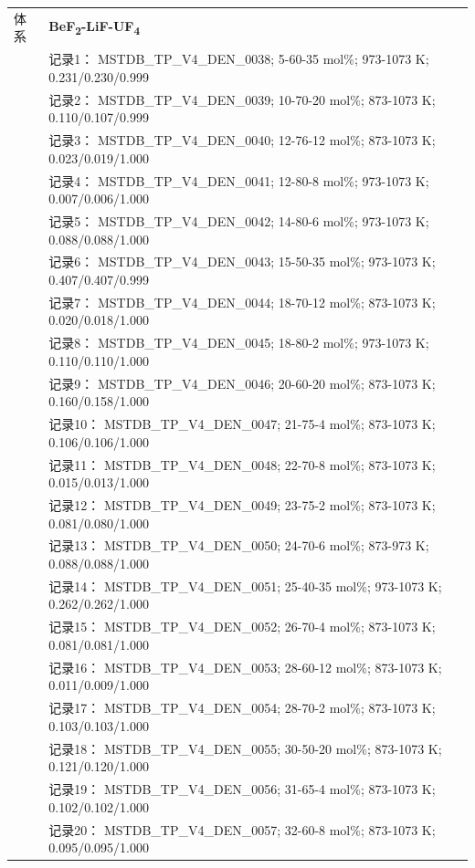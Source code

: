 \documentclass[12pt]{article}
\begin{document}
{\begin{longtable}[]{@{}
  >{\raggedright\arraybackslash}p{}
  >{\raggedright\arraybackslash}p{}@{}}
\midrule
体系 & \textbf{BeF\textsubscript{2}-LiF-UF\textsubscript{4}} \\
 & 记录1： MSTDB\_TP\_V4\_DEN\_0038; 5-60-35 mol\%; 973-1073 K; 0.231/0.230/0.999 \\
 & 记录2： MSTDB\_TP\_V4\_DEN\_0039; 10-70-20 mol\%; 873-1073 K; 0.110/0.107/0.999 \\
 & 记录3： MSTDB\_TP\_V4\_DEN\_0040; 12-76-12 mol\%; 873-1073 K; 0.023/0.019/1.000 \\
 & 记录4： MSTDB\_TP\_V4\_DEN\_0041; 12-80-8 mol\%; 973-1073 K; 0.007/0.006/1.000 \\
 & 记录5： MSTDB\_TP\_V4\_DEN\_0042; 14-80-6 mol\%; 973-1073 K; 0.088/0.088/1.000 \\
 & 记录6： MSTDB\_TP\_V4\_DEN\_0043; 15-50-35 mol\%; 973-1073 K; 0.407/0.407/0.999 \\
 & 记录7： MSTDB\_TP\_V4\_DEN\_0044; 18-70-12 mol\%; 873-1073 K; 0.020/0.018/1.000 \\
 & 记录8： MSTDB\_TP\_V4\_DEN\_0045; 18-80-2 mol\%; 973-1073 K; 0.110/0.110/1.000 \\
 & 记录9： MSTDB\_TP\_V4\_DEN\_0046; 20-60-20 mol\%; 873-1073 K; 0.160/0.158/1.000 \\
 & 记录10： MSTDB\_TP\_V4\_DEN\_0047; 21-75-4 mol\%; 873-1073 K; 0.106/0.106/1.000 \\
 & 记录11： MSTDB\_TP\_V4\_DEN\_0048; 22-70-8 mol\%; 873-1073 K; 0.015/0.013/1.000 \\
 & 记录12： MSTDB\_TP\_V4\_DEN\_0049; 23-75-2 mol\%; 873-1073 K; 0.081/0.080/1.000 \\
 & 记录13： MSTDB\_TP\_V4\_DEN\_0050; 24-70-6 mol\%; 873-973 K; 0.088/0.088/1.000 \\
 & 记录14： MSTDB\_TP\_V4\_DEN\_0051; 25-40-35 mol\%; 973-1073 K; 0.262/0.262/1.000 \\
 & 记录15： MSTDB\_TP\_V4\_DEN\_0052; 26-70-4 mol\%; 873-1073 K; 0.081/0.081/1.000 \\
 & 记录16： MSTDB\_TP\_V4\_DEN\_0053; 28-60-12 mol\%; 873-1073 K; 0.011/0.009/1.000 \\
 & 记录17： MSTDB\_TP\_V4\_DEN\_0054; 28-70-2 mol\%; 873-1073 K; 0.103/0.103/1.000 \\
 & 记录18： MSTDB\_TP\_V4\_DEN\_0055; 30-50-20 mol\%; 873-1073 K; 0.121/0.120/1.000 \\
 & 记录19： MSTDB\_TP\_V4\_DEN\_0056; 31-65-4 mol\%; 873-1073 K; 0.102/0.102/1.000 \\
 & 记录20： MSTDB\_TP\_V4\_DEN\_0057; 32-60-8 mol\%; 873-1073 K; 0.095/0.095/1.000 \\

\end{longtable}}
\end{document}
